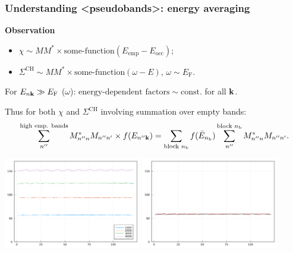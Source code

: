 \documentclass[t]{beamer}
\newcommand{\shortcode}[1]{\texttt{#1}}
\newcommand*{\const}{\text{const}}
\def\texttt#1{<#1>}%
\begin{document}
\begin{frame}[allowframebreaks]
\frametitle{Understanding \shortcode{pseudobands}: energy averaging}

\textbf{Observation} 
\begin{itemize}
    \item $\chi \sim M M^* \times \text{some-function}(E_{\text{emp}} - E_{\text{occ}})$;
    \item $\Sigma^{\text{CH}} \sim M M^* \times \text{some-function}(\omega - E)$, \quad 
    $\omega \sim E_{\text{F}}$.
\end{itemize}

\vspace{0.5cm}

\faHandPointRight For $E_{n \vb{k}} \gg E_{\text{F}}$ ($\omega$):  
$\text{energy-dependent factors} \sim \const.$ for all $\vb{k}$.

\vspace{0.5cm}

Thus for both $\chi$ and $\Sigma^{\text{CH}}$ involving summation over empty bands:
\begin{equation*}
    \sum_{n''}^{\text{high emp. bands}} M_{n'' n}^* M_{n'' n'} \times f(E_{n'' \vb{k}}) 
    = \sum_{\text{block $n_{\text{b}}$}} f(\bar{E}_{n_{\text{b}}}) \sum_{n''}^{\text{block $n_{\text{b}}$}}
    M_{n'' n}^* M_{n'' n'}.
\end{equation*}


\framebreak

\begin{center}
    \includegraphics[width=0.45\textwidth]{../data/energy/energies-different-blocks.png}
    \includegraphics[width=0.45\textwidth]{../data/energy/energies-same-blocks-1062.png}
\end{center}


\end{frame}
\end{document}
